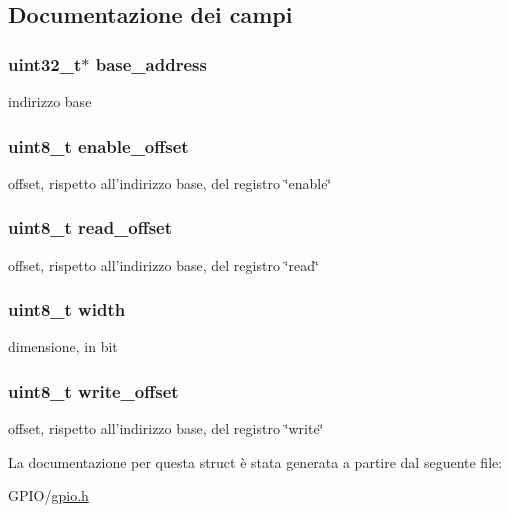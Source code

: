 \subsection{Documentazione dei campi}
\hypertarget{struct_g_p_i_o__t_a79c591d5fa42efdf86abd98347fece90}{
\subsubsection[{base\+\_\+address}]{\setlength{\rightskip}{0pt plus 5cm}uint32\+\_\+t$\ast$ base\+\_\+address}}\label{struct_g_p_i_o__t_a79c591d5fa42efdf86abd98347fece90}
indirizzo base \hypertarget{struct_g_p_i_o__t_a14886d03a6936e5edd25a9ad27af16bd}{
\subsubsection[{enable\+\_\+offset}]{\setlength{\rightskip}{0pt plus 5cm}uint8\+\_\+t enable\+\_\+offset}}\label{struct_g_p_i_o__t_a14886d03a6936e5edd25a9ad27af16bd}
offset, rispetto all'indirizzo base, del registro \char`\"{}enable\char`\"{} \hypertarget{struct_g_p_i_o__t_ab65acde67dc46f1d163e2ee468420b48}{
\subsubsection[{read\+\_\+offset}]{\setlength{\rightskip}{0pt plus 5cm}uint8\+\_\+t read\+\_\+offset}}\label{struct_g_p_i_o__t_ab65acde67dc46f1d163e2ee468420b48}
offset, rispetto all'indirizzo base, del registro \char`\"{}read\char`\"{} \hypertarget{struct_g_p_i_o__t_a09a2a45f731b02946ff6d3cd15c1a476}{
\subsubsection[{width}]{\setlength{\rightskip}{0pt plus 5cm}uint8\+\_\+t width}}\label{struct_g_p_i_o__t_a09a2a45f731b02946ff6d3cd15c1a476}
dimensione, in bit \hypertarget{struct_g_p_i_o__t_abb65e5db6d4ad365a7c48d00e4af1f78}{
\subsubsection[{write\+\_\+offset}]{\setlength{\rightskip}{0pt plus 5cm}uint8\+\_\+t write\+\_\+offset}}\label{struct_g_p_i_o__t_abb65e5db6d4ad365a7c48d00e4af1f78}
offset, rispetto all'indirizzo base, del registro \char`\"{}write\char`\"{} 

La documentazione per questa struct è stata generata a partire dal seguente file\+:\begin{DoxyCompactItemize}
\item 
G\+P\+I\+O/\hyperlink{gpio_8h}{gpio.\+h}\end{DoxyCompactItemize}
